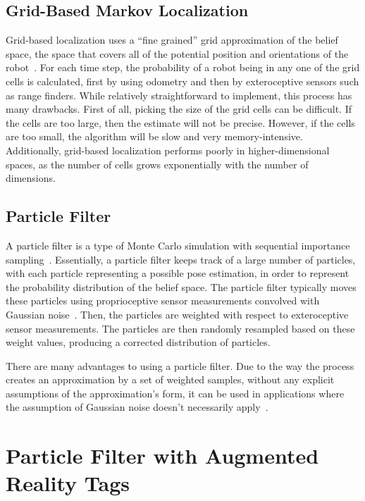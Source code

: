 	\subsection{Grid-Based Markov Localization}
	Grid-based localization uses a ``fine grained'' grid approximation of the belief space, the space that covers all of the potential position and orientations of the robot~\cite{Fox}. For each time step, the probability of a robot being in any one of the grid cells is calculated, first by using odometry and then by exteroceptive sensors such as range finders. While relatively straightforward to implement, this process has many drawbacks. First of all, picking the size of the grid cells can be difficult. If the cells are too large, then the estimate will not be precise. However, if the cells are too small, the algorithm will be slow and very memory-intensive. Additionally, grid-based localization performs poorly in higher-dimensional spaces, as the number of cells grows exponentially with the number of dimensions.

	\subsection{Particle Filter}
	A particle filter is a type of Monte Carlo simulation with sequential importance sampling~\cite{Alkhatib}. Essentially, a particle filter keeps track of a large number of particles, with each particle representing a possible pose estimation, in order to represent the probability distribution of the belief space. The particle filter typically moves these particles using proprioceptive sensor measurements convolved with Gaussian noise~\cite{Fox}. Then, the particles are weighted with respect to exteroceptive sensor measurements. The particles are then randomly resampled based on these weight values, producing a corrected distribution of particles.

	There are many advantages to using a particle filter. Due to the way the process creates an approximation by a set of weighted samples, without any explicit assumptions of the approximation's form, it can be used in applications where the assumption of Gaussian noise doesn't necessarily apply~\cite{Alkhatib}.

\section{Particle Filter with Augmented Reality Tags}

